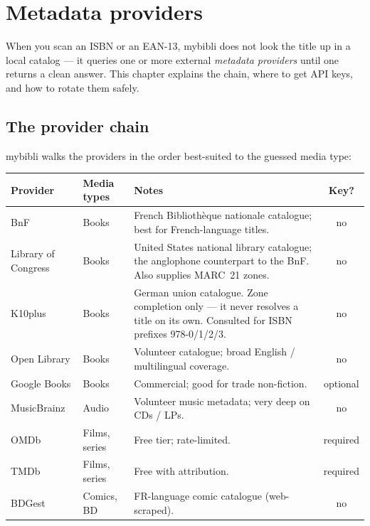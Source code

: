 \chapter{Metadata providers}
\label{ch:providers}

When you scan an ISBN or an EAN-13, mybibli does not look the title
up in a local catalog — it queries one or more external
\emph{metadata providers} until one
returns a clean answer. This chapter explains the chain, where to
get API keys, and how to rotate them safely.

\section{The provider chain}

mybibli walks the providers in the order best-suited to the guessed
media type:

\begin{longtable}{@{} l l p{4.5cm} c @{}}
\toprule
\textbf{Provider} & \textbf{Media types} & \textbf{Notes} & \textbf{Key?} \\
\midrule
\endhead
BnF\index{BnF}                  & Books         & French
Bibliothèque nationale catalogue; best for French-language titles. & no \\
Library of Congress\index{Library of Congress} & Books & United
States national library catalogue; the anglophone counterpart to the
BnF. Also supplies MARC~21 zones. & no \\
K10plus\index{K10plus}          & Books         & German union
catalogue. Zone completion only — it never resolves a title on its
own. Consulted for ISBN prefixes 978-0/1/2/3. & no \\
Open Library\index{Open Library} & Books         & Volunteer
catalogue; broad English / multilingual coverage. & no \\
Google Books\index{Google Books} & Books         & Commercial; good
for trade non-fiction. & optional \\
MusicBrainz\index{MusicBrainz}  & Audio         & Volunteer music
metadata; very deep on CDs / LPs. & no \\
OMDb\index{OMDb}                & Films, series & Free tier; rate-limited. & required \\
TMDb\index{TMDb}                & Films, series & Free with attribution. & required \\
BDGest\index{BDGest}            & Comics, BD    & FR-language comic
catalogue (web-scraped). & no \\
\bottomrule
\end{longtable}

